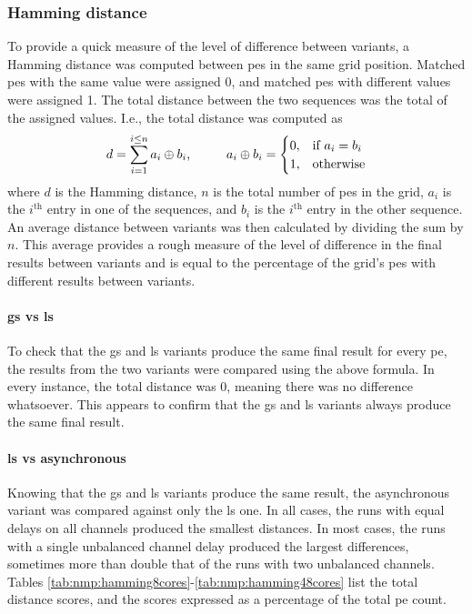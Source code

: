 \subsubsection{Hamming distance}
To provide a quick measure of the level of difference between variants, a Hamming distance was computed between \glspl{pe} in the same grid position.  Matched \glspl{pe} with the same value were assigned 0, and matched \glspl{pe} with different values were assigned 1.  The total distance between the two sequences was the total of the assigned values.  I.e., the total distance was computed as \[d = \sum_{i = 1}^{i \leq n} a_i \oplus b_i\text{,}
\hspace{1.0cm}%
a_i \oplus b_i = \begin{cases}
    0, & \text{if } a_i = b_i \\
    1, & \text{otherwise}
\end{cases}
\] where \(d\) is the Hamming distance, \(n\) is the total number of \glspl{pe} in the grid, \(a_i\) is the \(i^{\text{th}}\) entry in one of the sequences, and \(b_i\) is the \(i^{\text{th}}\) entry in the other sequence.  An average distance between variants was then calculated by dividing the sum by \(n\).  This average provides a rough measure of the level of difference in the final results between variants and is equal to the percentage of the grid's \glspl{pe} with different results between variants.

\paragraph{\Gls{gs} vs \gls{ls}}
To check that the \gls{gs} and \gls{ls} variants produce the same final result for every \gls{pe}, the results from the two variants were compared using the above formula.  In every instance, the total distance was 0, meaning there was no difference whatsoever.  This appears to confirm that the \gls{gs} and \gls{ls} variants always produce the same final result.

\paragraph{\Gls{ls} vs asynchronous}
Knowing that the \gls{gs} and \gls{ls} variants produce the same result, the asynchronous variant was compared against only the \gls{ls} one.  In all cases, the runs with equal delays on all channels produced the smallest distances.  In most cases, the runs with a single unbalanced channel delay produced the largest differences, sometimes more than double that of the runs with two unbalanced channels.  Tables \ref{tab:nmp:hamming8cores}-\ref{tab:nmp:hamming48cores} list the total distance scores, and the scores expressed as a percentage of the total \gls{pe} count.

